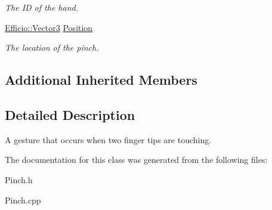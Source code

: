 \begin{DoxyCompactItemize}
\begin{DoxyCompactList}\small\item\em The ID of the hand. \end{DoxyCompactList}\item 
\hyperlink{class_efficio_1_1_vector3}{Efficio\+::\+Vector3} \hyperlink{class_efficio_1_1_input_recognition_1_1_human_1_1_hand_1_1_pinch_a377fb8ac2fe65a145c6ff949a96b658f}{Position}\hypertarget{class_efficio_1_1_input_recognition_1_1_human_1_1_hand_1_1_pinch_a377fb8ac2fe65a145c6ff949a96b658f}{}\label{class_efficio_1_1_input_recognition_1_1_human_1_1_hand_1_1_pinch_a377fb8ac2fe65a145c6ff949a96b658f}

\begin{DoxyCompactList}\small\item\em The location of the pinch. \end{DoxyCompactList}\end{DoxyCompactItemize}
\subsection*{Additional Inherited Members}


\subsection{Detailed Description}
A gesture that occurs when two finger tips are touching. 

The documentation for this class was generated from the following files\+:\begin{DoxyCompactItemize}
\item 
Pinch.\+h\item 
Pinch.\+cpp\end{DoxyCompactItemize}
